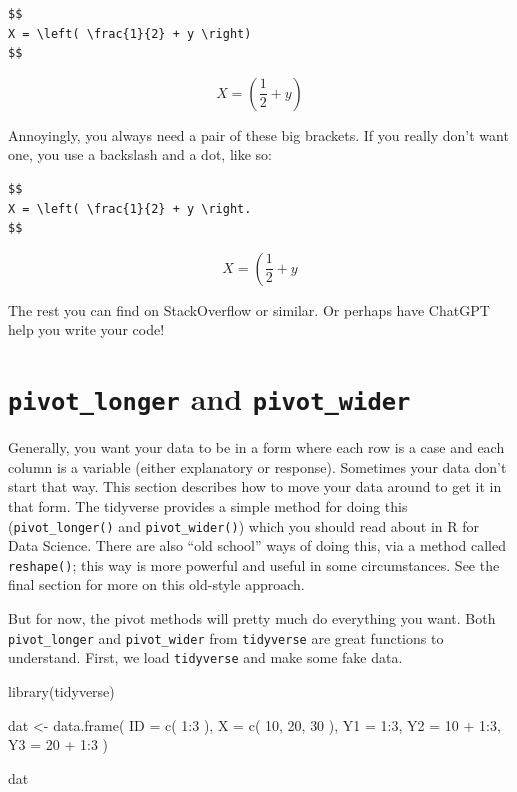 \documentclass[
  letterpaper,
  DIV=11,
  numbers=noendperiod]{scrreprt}
\newenvironment{Shaded}{\begin{snugshade}}{\end{snugshade}}
\newcommand{\AttributeTok}[1]{\textcolor[rgb]{0.49,0.56,0.16}{#1}}
\newcommand{\DecValTok}[1]{\textcolor[rgb]{0.25,0.63,0.44}{#1}}
\newcommand{\FunctionTok}[1]{\textcolor[rgb]{0.02,0.16,0.49}{#1}}
\newcommand{\NormalTok}[1]{\textcolor[rgb]{0.00,0.44,0.13}{#1}}
\newcommand{\OtherTok}[1]{\textcolor[rgb]{0.00,0.44,0.13}{#1}}
\newcommand{\SpecialCharTok}[1]{\textcolor[rgb]{0.25,0.44,0.63}{#1}}
\begin{document}
\begin{verbatim}
$$
X = \left( \frac{1}{2} + y \right)
$$
\end{verbatim}

\[
X = \left( \frac{1}{2} + y \right)
\]

Annoyingly, you always need a pair of these big brackets. If you really
don't want one, you use a backslash and a dot, like so:

\begin{verbatim}
$$
X = \left( \frac{1}{2} + y \right.
$$
\end{verbatim}

\[
X = \left( \frac{1}{2} + y \right.
\]

The rest you can find on StackOverflow or similar. Or perhaps have
ChatGPT help you write your code!

\hypertarget{pivot_longer-and-pivot_wider}{%
\chapter{\texorpdfstring{\texttt{pivot\_longer} and
\texttt{pivot\_wider}}{pivot\_longer and pivot\_wider}}\label{pivot_longer-and-pivot_wider}}

Generally, you want your data to be in a form where each row is a case
and each column is a variable (either explanatory or response).
Sometimes your data don't start that way. This section describes how to
move your data around to get it in that form. The tidyverse provides a
simple method for doing this (\texttt{pivot\_longer()} and
\texttt{pivot\_wider()}) which you should read about in R for Data
Science. There are also ``old school'' ways of doing this, via a method
called \texttt{reshape()}; this way is more powerful and useful in some
circumstances. See the final section for more on this old-style
approach.

But for now, the pivot methods will pretty much do everything you want.
Both \texttt{pivot\_longer} and \texttt{pivot\_wider} from
\texttt{tidyverse} are great functions to understand. First, we load
\texttt{tidyverse} and make some fake data.

\begin{Shaded}
\begin{Highlighting}[]
\FunctionTok{library}\NormalTok{(tidyverse)}

\NormalTok{dat }\OtherTok{\textless{}{-}} \FunctionTok{data.frame}\NormalTok{( }\AttributeTok{ID =} \FunctionTok{c}\NormalTok{( }\DecValTok{1}\SpecialCharTok{:}\DecValTok{3}\NormalTok{ ), }
                  \AttributeTok{X =} \FunctionTok{c}\NormalTok{( }\DecValTok{10}\NormalTok{, }\DecValTok{20}\NormalTok{, }\DecValTok{30}\NormalTok{ ),}
                  \AttributeTok{Y1 =} \DecValTok{1}\SpecialCharTok{:}\DecValTok{3}\NormalTok{,}
                  \AttributeTok{Y2 =} \DecValTok{10} \SpecialCharTok{+} \DecValTok{1}\SpecialCharTok{:}\DecValTok{3}\NormalTok{,}
                  \AttributeTok{Y3 =} \DecValTok{20} \SpecialCharTok{+} \DecValTok{1}\SpecialCharTok{:}\DecValTok{3}\NormalTok{ )}

\NormalTok{dat}
\end{Highlighting}
\end{Shaded}
\end{document}
